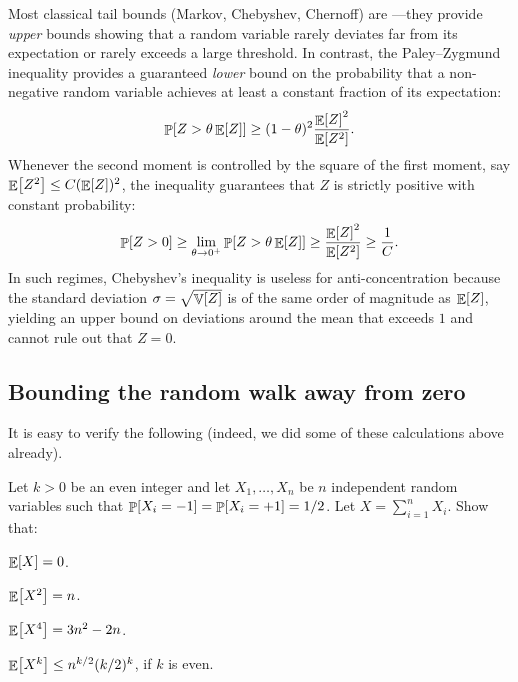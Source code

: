 Most classical tail bounds (Markov, Chebyshev, Chernoff) are
---they provide \emph{upper} bounds
showing that a random variable rarely deviates far from its expectation
or rarely exceeds a large threshold. In contrast, the Paley--Zygmund
inequality provides a guaranteed \emph{lower} bound on the probability
that a non-negative random variable achieves at least a constant fraction
of its expectation:
\begin{equation*}
    \Prob{Z > \theta \Ex{Z}} \geq (1-\theta)^2 \frac{\Ex{Z}^2}{\Ex{Z^2}}.
\end{equation*}
Whenever the second moment is controlled by the square of the first moment, say $\mathop{\mathbb{E}}\!\left[ {Z^2} \right] \leq C (\mathop{\mathbb{E}}\!\left[ {Z} \right])^2$, the inequality guarantees that $Z$ is strictly positive with constant probability:
\begin{equation*}
    \Prob{Z > 0} \geq \lim_{\theta \to 0^+} \Prob{Z > \theta \Ex{Z}} \geq \frac{\Ex{Z}^2}{\Ex{Z^2}} \geq \frac{1}{C}.
\end{equation*}
In such regimes, Chebyshev's inequality is useless for anti-concentration
because the standard deviation $\sigma = \sqrt{\mathop{\mathbb{V}}\!\left[ {Z} \right]}$ is of the same
order of magnitude as $\mathop{\mathbb{E}}\!\left[ {Z} \right]$, yielding an upper bound on deviations
around the mean that exceeds $1$ and cannot rule out that $Z = 0$.



\subsection{Bounding the random walk away from zero}

It is easy to verify the following (indeed, we did some of these
calculations above already).


\begin{exercise}
    Let $k > 0$ be an even integer and let $X_1, \ldots, X_n$ be $n$
    independent random variables such that
    $\Prob{X_i=-1} = \Prob{X_i =+1} = 1/2$. Let
    $X = \sum_{i=1}^n X_i$. Show that:
    \begin{compactenumi}
        \smallskip%
        \item $\mathop{\mathbb{E}}\!\left[ {X} \right] = 0$.
        \smallskip%
        \item $\mathop{\mathbb{E}}\!\left[ {X^2} \right] = n$.

        \smallskip%
        \item $\mathop{\mathbb{E}}\!\left[ {X^4} \right] = 3n^2 - 2n$.

        \smallskip%
        \item $\mathop{\mathbb{E}}\!\left[ { X^{k}} \right] \leq n^{k/2} (k/2)^k$, if $k$ is even.
    \end{compactenumi}
\end{exercise}


